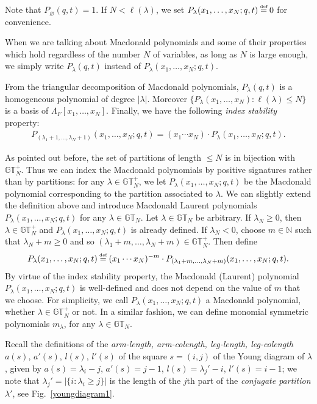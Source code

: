 \documentclass[pdftex]{sigma}
\numberwithin{equation}{section}
\newcommand\myeq{\mathrel{\stackrel{\makebox[0pt]{\mbox{\normalfont\tiny def}}}{=}}}
\newcommand{\N}{\mathbb{N}}
\newcommand{\GT}{\mathbb{GT}}
\newcommand{\GTp}{\mathbb{GT}^+}
\begin{document}
Note that $P_{\varnothing}(q, t) = 1$. If $N < \ell(\lambda)$, we set $P_{\lambda}(x_1, \dots, x_N; q, t) \myeq 0$ for convenience.

When we are talking about Macdonald polynomials and some of their properties which hold regardless of the number $N$ of variables, as long as $N$ is large enough, we simply write $P_{\lambda}(q, t)$ instead of $P_{\lambda}(x_1, \dots, x_N; q, t)$.

From the triangular decomposition of Macdonald polynomials, $P_{\lambda}(q, t)$ is a homogeneous polynomial of degree $|\lambda|$. Moreover $\{P_{\lambda}(x_1, \dots, x_N) \colon \ell(\lambda) \leq N\}$ is a basis of $\Lambda_F[x_1, \dots, x_N]$. Finally, we have the following \textit{index stability} property:
\begin{gather}\label{macdonaldsignatures1}
P_{(\lambda_1 + 1, \dots, \lambda_N + 1)}(x_1, \dots, x_N; q, t) = (x_1\cdots x_N)\cdot P_{\lambda}(x_1, \dots, x_N; q, t).
\end{gather}

As pointed out before, the set of partitions of length $\leq N$ is in bijection with $\GTp_N$. Thus we can index the Macdonald polynomials by positive signatures rather than by partitions: for any $\lambda\in\GTp_N$, we let $P_{\lambda}(x_1, \dots, x_N; q, t)$ be the Macdonald polynomial corresponding to the partition associated to $\lambda$. We can slightly extend the def\/inition above and introduce Macdonald Laurent polynomials $P_{\lambda}(x_1, \dots, x_N; q, t)$ for any $\lambda\in\GT_N$. Let $\lambda\in\GT_N$ be arbitrary. If $\lambda_N \geq 0$, then $\lambda\in\GTp_N$ and $P_{\lambda}(x_1, \dots, x_N; q, t)$ is already def\/ined. If $\lambda_N < 0$, choose $m\in\N$ such that $\lambda_N + m \geq 0$ and so $(\lambda_1 + m, \dots, \lambda_N + m)\in\GTp_N$. Then def\/ine
\begin{gather}\label{macdonaldsignatures11}
P_{\lambda}(x_1, \dots, x_N; q, t) \myeq (x_1\cdots x_N)^{-m}\cdot P_{(\lambda_1 + m, \dots, \lambda_N + m)}(x_1, \dots, x_N; q, t).
\end{gather}
By virtue of the index stability property, the Macdonald (Laurent) polynomial $P_{\lambda}(x_1, \dots, x_N; q, t)$ is well-def\/ined and does not depend on the value of $m$ that we choose. For simplicity, we call $P_{\lambda}(x_1, \dots, x_N; q, t)$ a Macdonald polynomial, whether $\lambda\in\GTp_N$ or not. In a similar fashion, we can def\/ine monomial symmetric polynomials $m_{\lambda}$, for any $\lambda\in\GT_N$.

Recall the def\/initions of the \textit{arm-length, arm-colength, leg-length, leg-colength} $a(s)$, $a'(s)$, $l(s)$, $l'(s)$ of the square $s = (i, j)$ of the Young diagram of $\lambda$, given by $a(s) = \lambda_i - j$, $a'(s) = j - 1$, $l(s) = \lambda_j' - i$, $l'(s) = i - 1$;
we note that $\lambda_j' = |\{ i\colon \lambda_i \geq j \} |$ is the length of the $j$th part of the \textit{conjugate partition} $\lambda'$, see Fig.~\ref{youngdiagram1}.
\end{document}

